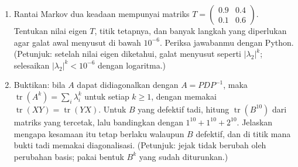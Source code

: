 \begin{latihan}
\begin{enumerate}
  \item Rantai Markov dua keadaan mempunyai matriks
        $T=\begin{pmatrix}0.9&0.4\\ 0.1&0.6\end{pmatrix}$. Tentukan nilai eigen $T$, titik
        tetapnya, dan banyak langkah yang diperlukan agar galat awal menyusut di bawah
        $10^{-6}$. Periksa jawabanmu dengan Python.
        (Petunjuk: setelah nilai eigen diketahui, galat menyusut seperti $|\lambda_{2}|^{k}$;
        selesaikan $|\lambda_{2}|^{k}<10^{-6}$ dengan logaritma.)

  \item Buktikan: bila $A$ dapat didiagonalkan dengan $A=PDP^{-1}$, maka
        $\operatorname{tr}(A^{k})=\sum_{i}\lambda_{i}^{k}$ untuk setiap $k\ge1$, dengan memakai
        $\operatorname{tr}(XY)=\operatorname{tr}(YX)$. Untuk $B$ yang defektif tadi, hitung
        $\operatorname{tr}(B^{10})$ dari matriks yang tercetak, lalu bandingkan dengan
        $1^{10}+1^{10}+2^{10}$. Jelaskan mengapa kesamaan itu tetap berlaku walaupun $B$
        defektif, dan di titik mana bukti tadi memakai diagonalisasi.
        (Petunjuk: jejak tidak berubah oleh perubahan basis; pakai bentuk $B^{k}$ yang sudah
        diturunkan.)
\end{enumerate}
\end{latihan}


